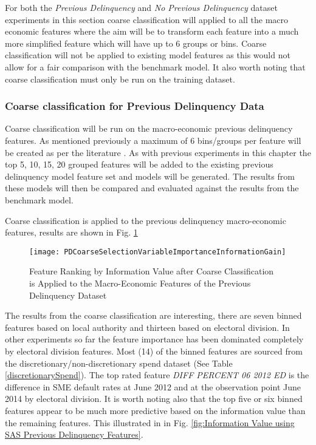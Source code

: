 For both the \textit{Previous Delinquency} and \textit{No Previous Delinquency} dataset experiments in this section coarse classification will applied to all the macro economic features where the aim will be to transform each feature into a much more simplified feature which will have up to 6 groups or bins. Coarse classification will not be applied to existing model features as this would not allow for a fair comparison with the benchmark model. It also worth noting that coarse classification must only be run on the training dataset.


\subsubsection{Coarse classification for Previous Delinquency Data}
Coarse classification will be run on the macro-economic previous delinquency features. As mentioned previously a maximum of 6 bins/groups per feature will be created as per the literature  \citep{hand_optimal_2005}. As with previous experiments in this chapter the top 5, 10, 15, 20 grouped features will be added to the existing previous delinquency model feature set and models will be generated. The results from these models will then be compared and evaluated against the results from the benchmark model.

Coarse classification is applied to the previous delinquency macro-economic features, results are shown in Fig. \ref{fig:PDCoarseSelectionVariableImportanceInformationGain}

\begin{figure}[H]
	\texttt{[image: PDCoarseSelectionVariableImportanceInformationGain]}
	\caption{Feature Ranking by Information Value after Coarse Classification \\is Applied to the Macro-Economic Features of the Previous Delinquency Dataset}
	\label{fig:PDCoarseSelectionVariableImportanceInformationGain}
\end{figure}

The results from the coarse classification are interesting, there are seven binned features based on local authority and thirteen based on electoral division. In other experiments so far the feature importance has been dominated completely by electoral division features. Most (14) of the binned features are sourced from the discretionary/non-discretionary spend dataset  (See Table \ref{discretionarySpend}). The top rated feature \textit{DIFF PERCENT 06 2012 ED} is the difference in SME default rates at June 2012 and at the observation point June 2014 by electoral division. It is worth noting also that the top five or six binned features appear to be much more predictive based on the information value than the remaining features. This illustrated in in Fig. \ref{fig:Information Value using SAS Previous Delinquency Features}.


